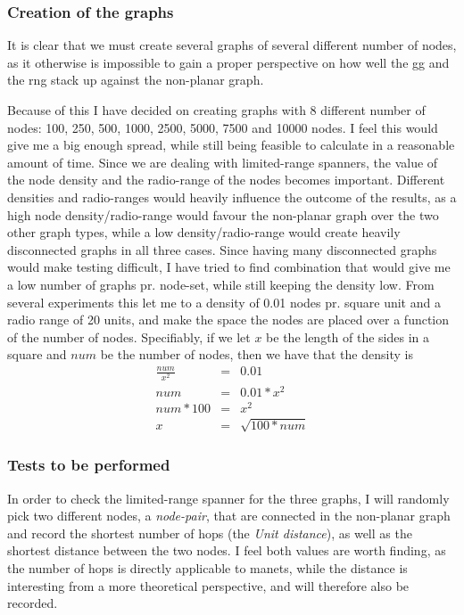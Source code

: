 \subsubsection{Creation of the graphs}
It is clear that we must create several graphs of several different number of nodes, as it otherwise is impossible to gain a proper perspective on how well the \ac{gg} and the \ac{rng} stack up against the non-planar graph.

Because of this I have decided on creating graphs with 8 different number of nodes: 100, 250, 500, 1000, 2500, 5000, 7500 and 10000 nodes. I feel this would give me a big enough spread, while still being feasible to calculate in a reasonable amount of time. Since we are dealing with limited-range spanners, the value of the node density and the radio-range of the nodes becomes important. Different densities and radio-ranges would heavily influence the outcome of the results, as a high node density/radio-range would favour the non-planar graph over the two other graph types, while a low density/radio-range would create heavily disconnected graphs in all three cases. Since having many disconnected graphs would make testing difficult, I have tried to find combination that would give me a low number of graphs pr. node-set, while still keeping the density low. From several experiments this let me to a density of 0.01 nodes pr. square unit and a radio range of 20 units, and make the space the nodes are placed over a function of the number of nodes. Specifiably, if we let $x$ be the length of the sides in a square and $num$ be the number of nodes, then we have that the density is
\begin{eqnarray}
\frac{num}{x^2} &=& 0.01 \\
num &=& 0.01 * x^2 \\
num * 100 &=& x^2 \\
x &=& \sqrt{100 * num}  
\end{eqnarray}

\subsubsection{Tests to be performed}
In order to check the limited-range spanner for the three graphs, I will randomly pick two different nodes, a \emph{node-pair}, that are connected in the non-planar graph and record the shortest number of hops (the \emph{Unit distance}), as well as the shortest distance between the two nodes. I feel both values are worth finding, as the number of hops is directly applicable to \acp{manet}, while the distance is interesting from a more theoretical perspective, and will therefore also be recorded. 

